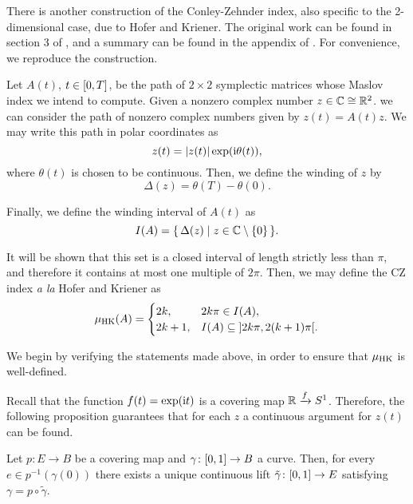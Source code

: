 There is another construction of the Conley-Zehnder index, also specific to the 2-dimensional case, due to Hofer and Kriener. The original work can be found in section 3 of \cite{hoferkriener}, and a summary can be found in the appendix of \cite{hwz}. For convenience, we reproduce the construction.

Let $A(t)$, $t \in \interval 0 T$, be the path of $2 \times 2$ symplectic matrices whose Maslov index we intend to compute. Given a nonzero complex number $z \in \mathbb{C} \cong \mathbb{R}^2$. we can consider the path of nonzero complex numbers given by $z(t) = A(t) z$. We may write this path in polar coordinates as
\begin{equation}
z(t) = \lvert z(t)\rvert \exp(\mathrm{i} \theta(t)),
\end{equation}
where $\theta(t)$ is chosen to be continuous. Then, we define the winding of $z$ by
\begin{equation}
\Delta(z) = \theta(T) - \theta(0).
\end{equation}

Finally, we define the winding interval of $A(t)$ as
\begin{equation}
I(A) = \{\, \Delta(z) \mid z \in \mathbb{C} \setminus \{0\} \,\}.
\end{equation}

It will be shown that this set is a closed interval of length strictly less than $\pi$, and therefore it contains at most one multiple of $2\pi$. Then, we may define the CZ index \textit{a la} Hofer and Kriener as
\begin{equation}\label{def:muhk}
\muhk(A) = \begin{cases}
2 k, & 2 k \pi \in I(A),\\
2k+1, & I(A) \subseteq \ointerval {2k\pi}{2(k+1)\pi}.
\end{cases} 
\end{equation}

We begin by verifying the statements made above, in order to ensure that $\mu_{\mathrm{HK}}$ is well-defined.

Recall that the function $f(t) = \exp(\mathrm{i} t)$ is a covering map $\mathbb{R} \xrightarrow{f} S^1$. Therefore, the following proposition guarantees that for each $z$ a continuous argument for $z(t)$ can be found.

\begin{prop}
Let $p \colon E \to B$ be a covering map and $\gamma \colon \interval01 \to B$ a curve. Then, for every $e \in p^{-1}(\gamma(0))$ there exists a unique continuous lift $\tilde \gamma \colon \interval01 \to E$ satisfying $\gamma = p \circ \tilde \gamma$.
\end{prop}

